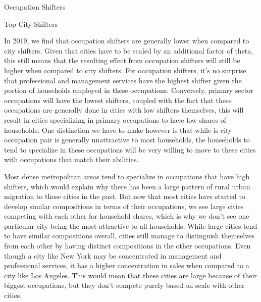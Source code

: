 \documentclass[10pt]{article}
\begin{document}
\begin{table}
    \centering
    \begin{minipage}{0.4\textwidth}
        \centering
        \caption{Occupation Shifters}
        
    \end{minipage}
    \hfill
    \begin{minipage}{0.55\textwidth}
        \centering
        \caption{Top City Shifters}
        
    \end{minipage}
\end{table}

In 2019, we find that occupation shifters are generally lower when compared to city shifters. Given that cities have to be scaled by an additional factor of theta, this still means that the resulting effect from occupation shifters will still be higher when compared to city shifters. For occupation shifters, it's no surprise that professional and management services have the highest shifter given the portion of households employed in these occupations. Conversely, primary sector occupations will have the lowest shifters, coupled with the fact that these occupations are generally done in cities with low shifters themselves, this will result in cities specializing in primary occupations to have low shares of households. One distinction we have to make however is that while is city occupation pair is generally unattractive to most households, the households to tend to specialize in these occupations will be very willing to move to these cities with occupations that match their abilities.

Most dense metropolitan areas tend to specialize in occupations that have high shifters, which would explain why there has been a large pattern of rural urban migration to those cities in the past. But now that most cities have started to develop similar compositions in terms of their occupations, we see large cities competing with each other for household shares, which is why we don't see one particular city being the most attractive to all households. While large cities tend to have similar compositions overall, cities still manage to distinguish themselves from each other by having distinct compositions in the other occupations. Even though a city like New York may be concentrated in management and professional services, it has a higher concentration in sales when compared to a city like Los Angeles. This would mean that these cities are large because of their biggest occupations, but they don't compete purely based on scale with other cities.
\end{document}
